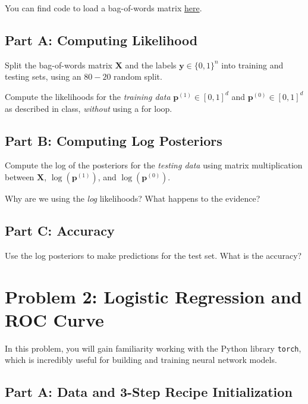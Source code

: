 \documentclass{article}
\begin{document}
You can find code to load a bag-of-words matrix \href{https://www.rtealwitter.com/datamining2025/psets/starter_code/spam_bag_of_words.py}{here}.

\subsection*{Part A: Computing Likelihood}

Split the bag-of-words matrix $\mathbf{X}$ and the labels $\mathbf{y} \in \{0,1\}^n$ into training and testing sets, using an $80-20$ random split.

Compute the likelihoods for the \textit{training data} $\mathbf{p}^{(1)} \in [0,1]^d$ and $\mathbf{p}^{(0)} \in [0,1]^d$ as described in class, \textit{without} using a for loop.

\subsection*{Part B: Computing Log Posteriors}

Compute the log of the posteriors for the \textit{testing data} using matrix multiplication between $\mathbf{X}$, $\log(\mathbf{p}^{(1)})$, and $\log(\mathbf{p}^{(0)})$.

Why are we using the \textit{log} likelihoods? What happens to the evidence?

\subsection*{Part C: Accuracy}

Use the log posteriors to make predictions for the test set. What is the accuracy?

%

\newpage

\section*{Problem 2: Logistic Regression and ROC Curve}

In this problem, you will gain familiarity working with the Python library \texttt{torch}, which is incredibly useful for building and training neural network models.

\subsection*{Part A: Data and 3-Step Recipe Initialization}
\end{document}
